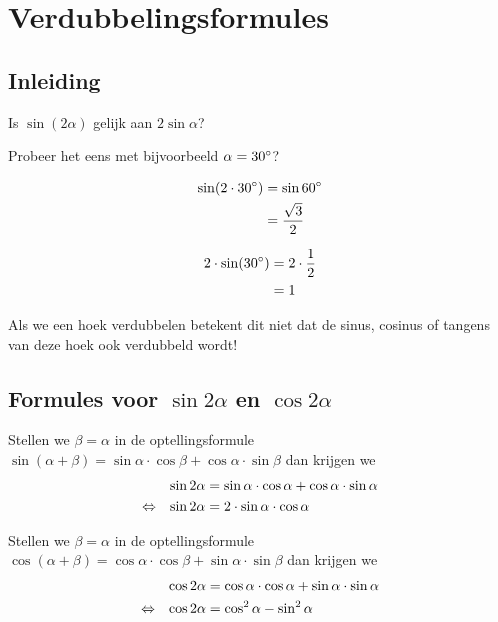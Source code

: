 \documentclass[a4paper,12pt]{article}
\begin{document}
\pagebreak
\section{Verdubbelingsformules}

\begin{theorie}

\subsection{Inleiding}
Is $\sin(2\alpha)$ gelijk aan $2\sin\alpha$?

Probeer het eens met bijvoorbeeld $\alpha=30^\circ$?

\begin{minipage}{0.3\textwidth}
\begin{align*}
  \sin(2\cdot30^\circ) &= \sin 60^\circ\\
                        &= \dfrac{\sqrt{3}}{2}
\end{align*}
\end{minipage}
\begin{minipage}{0.3\textwidth}
\begin{align*}
  2\cdot\sin(30^\circ) &= 2\cdot\dfrac{1}{2}\\
                        &= 1
\end{align*}
\end{minipage}

Als we een hoek verdubbelen betekent dit niet dat de sinus, cosinus of tangens van deze hoek ook verdubbeld wordt!

\subsection{Formules voor $\sin 2\alpha$ en $\cos 2\alpha$}


Stellen we $\beta=\alpha$ in de optellingsformule $\sin(\alpha+\beta)=\sin\alpha\cdot\cos\beta + \cos\alpha\cdot\sin\beta$ dan krijgen we
\begin{align*}
       && \sin 2\alpha &= \sin\alpha\cdot\cos\alpha+\cos\alpha\cdot\sin\alpha\\
  \Leftrightarrow && \sin 2\alpha &= 2\cdot\sin\alpha\cdot\cos\alpha
\end{align*}

Stellen we $\beta=\alpha$ in de optellingsformule $\cos(\alpha+\beta)=\cos\alpha\cdot\cos\beta + \sin\alpha\cdot\sin\beta$ dan krijgen we
\begin{align*}
       && \cos 2\alpha &= \cos\alpha\cdot\cos\alpha+\sin\alpha\cdot\sin\alpha\\
  \Leftrightarrow && \cos 2\alpha &= \cos^2\alpha -\sin^2\alpha
\end{align*}


\end{theorie}
\end{document}

